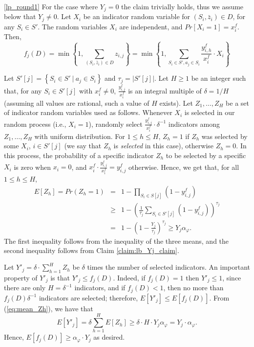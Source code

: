 \documentclass[11pt]{article}
\newcommand{\bz}{\bar{z}}
\newcommand{\xf}{x^{f}}
\newcommand{\yf}{y^{f}}
\newcommand{\bS}{S}
\newcommand{\alphaf}{\alpha_\varphi}
\newcommand{\abs}[1]{ \left| #1 \right |}
\newenvironment{dl_proof}[1]{\noindent{\bf Proof of Lemma #1:}}{
 \hspace*{\fill} $\Box$ \vskip \belowdisplayskip}
\begin{document}
{\begin{dl_proof} {\ref{lp_round1}}
For the case where $Y_j = 0$ the claim trivially holds, thus
we assume below that $Y_j \neq 0$.
Let $X_i$ be an indicator random variable for $(S_i,\bz_i) \in D$, for
any $S_i \in \bS'$. The random variables $X_i$ are independent,
and $Pr[X_i=1] = \xf_i$.  Then,
$$
f_j(D)= \min\left\{ 1, \sum_{(S_i,\bz_i) \in D} z_{i,j} \right\}=
\min\left\{1, \sum_{S_i\in \bS', a_j \in S_i} \frac{
\yf_{i,h
}}{\xf_i} \cdot X_i\right\}$$

Let $S'[j]
=\left \{S_i \in \bS'~|~ a_j \in S_i \right\}$
 and $\tau_j = \abs{S'[j]}$.
Let $H \geq 1$ be an integer
such that, for any $S_i\in S'[j]$ with $\xf_i \neq 0$,
$\frac{\yf_{i,j}}{\xf_i}$ is an integral multiple of $\delta = 1/H$
 (assuming all values are rational, such a value of $H$ exists).
 Let $Z_1,\ldots, Z_H$ be a set of indicator random variables used as follows.
Whenever $X_i$ is selected in our random process (i.e., $X_i=1$),
randomly select $\frac{\yf_{i,j}}{\xf_i} \cdot \delta^{-1}$
 indicators among $Z_1, \ldots, Z_H$ with uniform distribution.
 For $1 \leq h \leq H$, $Z_h=1$ if $Z_h$ was selected by some $X_i$, $i \in
 S'[j]$
(we say that $Z_h$ is {\em selected} in this case), otherwise $Z_h=0$.
 In this process, the probability of a specific indicator $Z_h$ to be
 selected by a specific $X_i$ is zero when $x_i=0$, and
$\xf_i \cdot \frac{\yf_{i,j}}{\xf_i} = \yf_{i,j}$ otherwise.
Hence, we get that, for all $1 \leq h \leq H$,
\begin{eqnarray}
E[Z_h] = Pr(Z_h =1) &=& 1- \prod_{S_i\in S[j]} \left(1-\yf_{i,j}
 \right ) \nonumber \\
& \geq &
 1-\left( \frac{1}{\tau_j} \sum_{S_i\in S'[j]} \left (  1- \yf_{i,j}
 \right ) \right) ^ {\tau_j} \nonumber \\
& =& 1- \left( 1- \frac{ Y_j}{\tau_j} \right ) ^{\tau_j} \geq Y_j \alphaf.
\label{eq:mean_Zh}
\end{eqnarray}
The first inequality follows from the inequality of the three means, and the
second inequality follows from Claim \ref{claim:lb_Yj_claim}.

Let $Y'_j= \delta \cdot \sum_{h=1}^{H} Z_h$ be $\delta$ times the number of selected indicators.
An important property of $Y'_j$ is that $Y'_j \leq f_j(D)$. Indeed, if
$f_j(D)=1$
then $Y'_j\leq 1$, since there are only $H=\delta^{-1}$
indicators, and if $f_j(D) <1$, then no more than $f_j(D)\delta^{-1}$
indicators are selected; therefore,
$E[Y'_j] \leq
E[f_j(D)]$.
From (\ref{eq:mean_Zh}), we have that
\[
E[Y'_j]=
\delta \sum_{h=1}^{H}
 E[Z_h] \geq \delta \cdot H \cdot   Y_j \alphaf = Y_j\cdot
 \alphaf.
 \]
Hence, $E[f_j(D)]\geq  \alphaf \cdot
Y_j$
as desired.
 \end{dl_proof}

}
\end{document}
